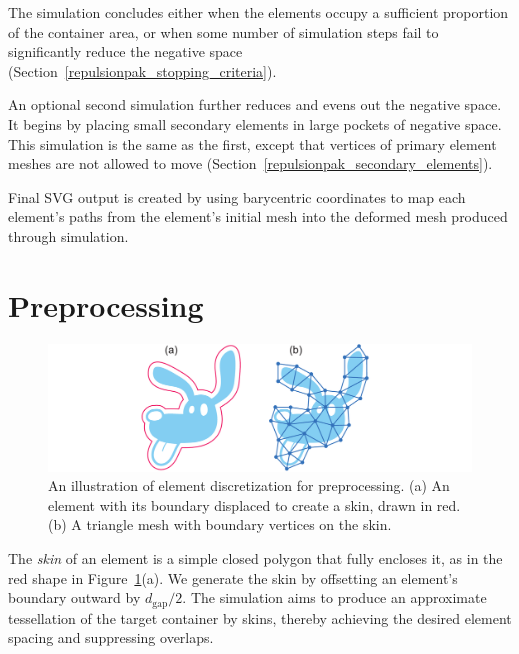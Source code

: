 The simulation concludes 
either when the elements occupy a sufficient proportion of the container area, or 
when some number of simulation steps fail to
significantly reduce the negative space
(Section~\ref{repulsionpak_stopping_criteria}).

An optional second simulation further reduces and evens out the
negative space.  It begins by placing small secondary elements in large
pockets of negative space.  This simulation is the same as the
first, except that vertices of primary element meshes are not allowed to move
(Section~\ref{repulsionpak_secondary_elements}).

Final SVG output is created by using barycentric coordinates to map each element's
paths from the element's initial mesh into the deformed mesh produced through
simulation.


\section{Preprocessing}
\label{repulsionpak_preprocessing}

\begin{figure}[t] %
\centering
\includegraphics[width=1.0\textwidth]{figures/repulsionpak/element_skin_triangles_2.pdf}
\caption[Element discretization]{
	\label{fig_elements_image}
	An illustration of element discretization for preprocessing.
	(a) An element with its boundary displaced to create a skin, drawn in red.
	(b) A triangle mesh with boundary vertices on the skin.
}
\end{figure}




The \textit{skin} of an element is a simple closed polygon 
that fully encloses it, 
as in the red shape in Figure~\ref{fig_elements_image}(a).
We generate the skin 
by offsetting 
an element's boundary outward by $d_\mathrm{gap}/2$. 
The simulation aims to produce an approximate tessellation of the target
container by  skins, thereby achieving the desired element spacing and
suppressing overlaps.

